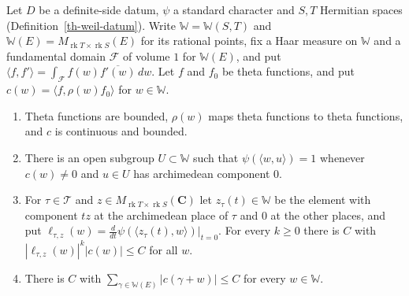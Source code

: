 \begin{lemma}\label{th-matrix-coefficients}
Let $D$ be a definite-side datum, $\psi$ a standard character and $S,T$
Hermitian spaces (Definition~\ref{th-weil-datum}). Write
$\mathbb W=\mathbb W(S,T)$ and
$\mathbb W(E)=M_{\operatorname{rk}T\times\operatorname{rk}S}(E)$ for its
rational points, fix a Haar measure on $\mathbb W$ and a fundamental domain
$\mathcal F$ of volume $1$ for $\mathbb W(E)$, and put
$\langle f,f'\rangle=\int_{\mathcal F}f(w)\overline{f'(w)}\,dw$. Let $f$ and
$f_0$ be theta functions, and put $c(w)=\langle f,\rho(w)f_0\rangle$ for
$w\in\mathbb W$.
\begin{enumerate}
\item Theta functions are bounded, $\rho(w)$ maps theta functions to theta
  functions, and $c$ is continuous and bounded.
\item There is an open subgroup $U\subset\mathbb W$ such that
  $\psi(\langle w,u\rangle)=1$ whenever $c(w)\neq0$ and $u\in U$ has
  archimedean component $0$.
\item For $\tau\in\mathcal T$ and
  $z\in M_{\operatorname{rk}T\times\operatorname{rk}S}(\mathbf C)$ let
  $z_\tau(t)\in\mathbb W$ be the element with component $tz$ at the
  archimedean place of $\tau$ and $0$ at the other places, and put
  $\ell_{\tau,z}(w)=\frac{d}{dt}\psi(\langle z_\tau(t),w\rangle)|_{t=0}$. For
  every $k\geq0$ there is $C$ with $|\ell_{\tau,z}(w)|^k|c(w)|\leq C$ for all
  $w$.
\item There is $C$ with $\sum_{\gamma\in\mathbb W(E)}|c(\gamma+w)|\leq C$ for
  every $w\in\mathbb W$.
\end{enumerate}
\end{lemma}

